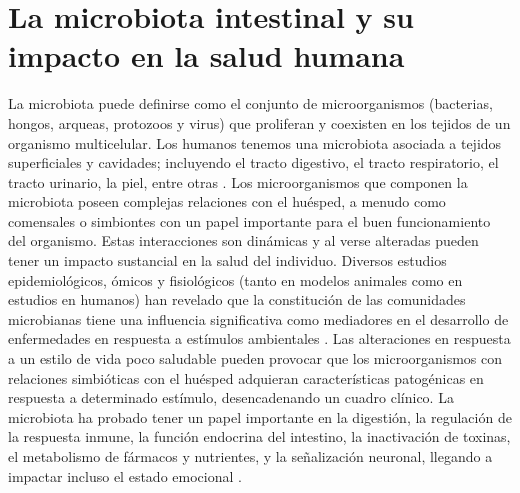 \documentclass[
]{book}
\begin{document}
\hypertarget{la-microbiota-intestinal-y-su-impacto-en-la-salud-humana}{%
\section*{La microbiota intestinal y su impacto en la salud humana}\label{la-microbiota-intestinal-y-su-impacto-en-la-salud-humana}}

La microbiota puede definirse como el conjunto de microorganismos (bacterias, hongos, arqueas, protozoos y virus) que proliferan y coexisten en los tejidos de un organismo multicelular. Los humanos tenemos una microbiota asociada a tejidos superficiales y cavidades; incluyendo el tracto digestivo, el tracto respiratorio, el tracto urinario, la piel, entre otras \citep{gamino2005flora}. Los microorganismos que componen la microbiota poseen complejas relaciones con el huésped, a menudo como comensales o simbiontes con un papel importante para el buen funcionamiento del organismo. Estas interacciones son dinámicas y al verse alteradas pueden tener un impacto sustancial en la salud del individuo. Diversos estudios epidemiológicos, ómicos y fisiológicos (tanto en modelos animales como en estudios en humanos) han revelado que la constitución de las comunidades microbianas tiene una influencia significativa como mediadores en el desarrollo de enfermedades en respuesta a estímulos ambientales \citep{fan2021gut}. Las alteraciones en respuesta a un estilo de vida poco saludable pueden provocar que los microorganismos con relaciones simbióticas con el huésped adquieran características patogénicas en respuesta a determinado estímulo, desencadenando un cuadro clínico. La microbiota ha probado tener un papel importante en la digestión, la regulación de la respuesta inmune, la función endocrina del intestino, la inactivación de toxinas, el metabolismo de fármacos y nutrientes, y la señalización neuronal, llegando a impactar incluso el estado emocional \citep{rothschild2018environment}.
\end{document}
